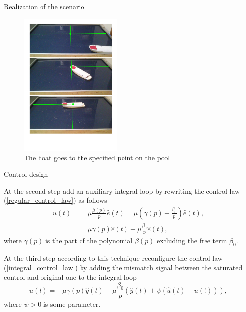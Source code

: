 \documentclass[10pt,pdf,hyperref={unicode}]{beamer}
\begin{document}
\begin{frame}{Realization of the scenario}
	
	\begin{figure}[t]
		\begin{center}
			\includegraphics[width=5cm]{experiment}
			\caption{The boat goes to the specified point on the pool}
			\label{experiment}
		\end{center}
	\end{figure}

\end{frame}

\begin{frame}{Control design}

At the second step add an auxiliary integral loop by rewriting the control law (\ref{regular_control_law}) as follows
\begin{eqnarray}
\label{integral_control_law}
u(t)&=&\mu\frac{\beta(p)}{p}\hat e(t)=\mu\left(\gamma(p)+\frac{\beta_0}{p}\right)\hat e(t),\nonumber\\
&=&\mu\gamma(p)\hat e(t)-\mu\frac{\beta_0}{p}\hat e(t),
\end{eqnarray}
where $\gamma(p)$ is the part of the polynomial $\beta(p)$ excluding the free term $\beta_0$.

 At the third step according to this technique reconfigure the control law (\ref{integral_control_law}) by adding the mismatch signal between the saturated control and original one to the integral loop
 \begin{equation}
 \label{control_law_AW}
 u(t)=-\mu\gamma(p)\hat y(t)-\mu\frac{\beta_0}{p}(\hat y(t)+\psi(\hat u(t)-u(t))),
 \end{equation}
 where $\psi>0$ is some parameter.

\end{frame}
\end{document}
